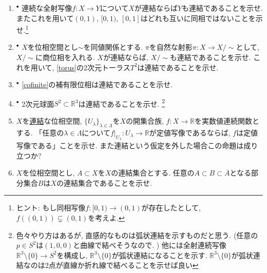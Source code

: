 \documentclass[dvipdfmx,a4paper,11pt]{article}
\newcommand{\R}{\mathbb{R}}
\newcommand{\C}{\mathbb{C}}
\theoremstyle{definition}
\begin{document}
\begin{enumerate}[label=\textbf{問}\ref*{sec-connected}.\arabic*]
	\setlength{\parskip}{0cm} 
  \setlength{\itemsep}{7pt} 


\item \label{connected_conti}$^{\bullet}$ 連続な全射写像$f: X \rightarrow Y$について$X$が連結ならば$Y$も連結であることを示せ. またこれを用いて$(0,1)$, $[0,1)$, $[0,1]$はどれも互いに同相ではないことを示せ.\footnote{ヒント: もし同相写像$f : [0,1) \to (0,1)$が存在したとして, $f((0,1)) \subsetneq (0,1)$を考えよ.}


\item $^{\bullet}$ $X$を位相空間とし$\sim$を同値関係とする. $\pi$を自然な射影$\pi : X\to X/\sim $として, $X/\sim$に商位相を入れる. $X$が連結ならば, $X/\sim$も連結であることを示せ. これを用いて, \ref{torus}の2次元トーラス$T^2$は連結であることを示せ. 

\item $^{\bullet}$ \ref{cofinite}の補有限位相は連結であることを示せ.

\item $^\bullet$  2次元球面$S^2 \subset \R^3$は連結であることを示せ. \footnote{色々やり方はあるが, 直感的なものは弧状連結を示すものだと思う. (任意の$p \in S^2$は$(1,0,0)$と曲線で結べそうなので. ) 他には全射連続写像$\R^3 \setminus \{ 0\} \to S^2$を構成し, $\R^3 \setminus \{ 0\} $が弧状連結になることを示す. $\R^3 \setminus \{ 0\} $が弧状連結なのは2点が直線か折れ線で結べることを示せば良い}

\item $X$を\underline{連結}な位相空間, $\{ U_{\lambda}\}_{\lambda \in \Lambda}$を$X$の開集合族, $f : X \to \R$を実数値連続関数とする.
「任意の$\lambda \in \Lambda$について$f|_{U_{\lambda}} : U_{\lambda} \to \R$が定値写像であるならば, $f$は定値写像である」ことを示せ. また連結という仮定を外した場合この命題は成り立つか?


\item  $X$を位相空間とし, $A \subset X$を$X$の連結集合とする. 任意の$A \subset B \subset \overline{A}$となる部分集合$B$は$X$の連結集合であることを示せ.


\end{enumerate}
\end{document}
